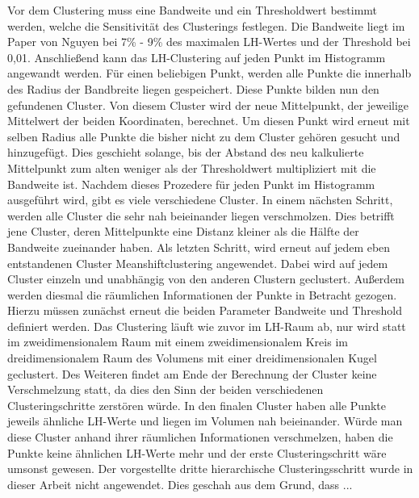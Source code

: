 Vor dem Clustering muss eine Bandweite und ein Thresholdwert bestimmt werden, welche die Sensitivität des Clusterings festlegen. Die Bandweite liegt im Paper von Nguyen \cite{} bei 7\% - 9\% des maximalen LH-Wertes und der Threshold bei 0,01. Anschließend kann das LH-Clustering auf jeden Punkt im Histogramm angewandt werden.
\newline
Für einen beliebigen Punkt, werden alle Punkte die innerhalb des Radius der Bandbreite liegen gespeichert. Diese Punkte bilden nun den gefundenen Cluster. Von diesem Cluster wird der neue Mittelpunkt, der jeweilige Mittelwert der beiden Koordinaten, berechnet. Um diesen Punkt wird erneut mit selben Radius alle Punkte die bisher nicht zu dem Cluster gehören gesucht und hinzugefügt. Dies geschieht solange, bis der Abstand des neu kalkulierte Mittelpunkt zum alten weniger als der Thresholdwert multipliziert mit die Bandweite ist. 
Nachdem dieses Prozedere für jeden Punkt im Histogramm ausgeführt wird, gibt es viele verschiedene Cluster. In einem nächsten Schritt, werden alle Cluster die sehr nah beieinander liegen verschmolzen. Dies betrifft jene Cluster, deren Mittelpunkte eine Distanz kleiner als die Hälfte der Bandweite zueinander haben.
\newline
Als letzten Schritt, wird erneut auf jedem eben entstandenen Cluster Meanshiftclustering angewendet. Dabei wird auf jedem Cluster einzeln und unabhängig von den anderen Clustern geclustert. Außerdem werden diesmal die räumlichen Informationen der Punkte in Betracht gezogen. Hierzu müssen zunächst erneut die beiden Parameter Bandweite und Threshold definiert werden. Das Clustering läuft wie zuvor im LH-Raum ab, nur wird statt im zweidimensionalem Raum mit einem zweidimensionalem Kreis im dreidimensionalem Raum des Volumens mit einer dreidimensionalen Kugel geclustert. Des Weiteren findet am Ende der Berechnung der Cluster keine Verschmelzung statt, da dies den Sinn der beiden verschiedenen Clusteringschritte zerstören würde. In den finalen Cluster haben alle Punkte jeweils ähnliche LH-Werte und liegen im Volumen nah beieinander. Würde man diese Cluster anhand ihrer räumlichen Informationen verschmelzen, haben die Punkte keine ähnlichen LH-Werte mehr und der erste Clusteringschritt wäre umsonst gewesen.
\newline
Der vorgestellte dritte hierarchische Clusteringsschritt wurde in dieser Arbeit nicht angewendet. Dies geschah aus dem Grund, dass ...

